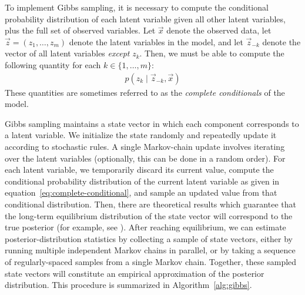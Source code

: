 \documentclass{article}
\begin{document}
To implement Gibbs sampling, it is necessary to compute the conditional probability distribution of each latent variable given all other latent variables, plus the full set of observed variables.
Let $\vec x$ denote the observed data, let $\vec z = (z_1, \ldots, z_m)$ denote the latent variables in the model, and let $\vec z_{-k}$ denote the vector of all latent variables \emph{except} $z_k$.
Then, we must be able to compute the following quantity for each $k \in \{1, \ldots, m\}$:
\begin{align}
p(z_k \mid \vec{z}_{-k}, \vec{x})
\label{eq:complete-conditional}
\end{align}
These quantities are sometimes referred to as the \emph{complete conditionals} of the model.

Gibbs sampling maintains a state vector in which each component corresponds to a latent variable.
We initialize the state randomly and repeatedly update it according to stochastic rules.
A single Markov-chain update involves iterating over the latent variables (optionally, this can be done in a random order).
For each latent variable, we temporarily discard its current value, compute the conditional probability distribution of the current latent variable as given in equation~\eqref{eq:complete-conditional}, and sample an updated value from that conditional distribution.
Then, there are theoretical results which guarantee that the long-term equilibrium distribution of the state vector will correspond to the true posterior (for example, see \cite{resnik2010gibbs}).
After reaching equilibrium, we can estimate posterior-distribution statistics by collecting a sample of state vectors, either by running multiple independent Markov chains in parallel, or by taking a sequence of regularly-spaced samples from a single Markov chain.
Together, these sampled state vectors will constitute an empirical approximation of the posterior distribution.
This procedure is summarized in Algorithm~\ref{alg:gibbs}.
\end{document}
